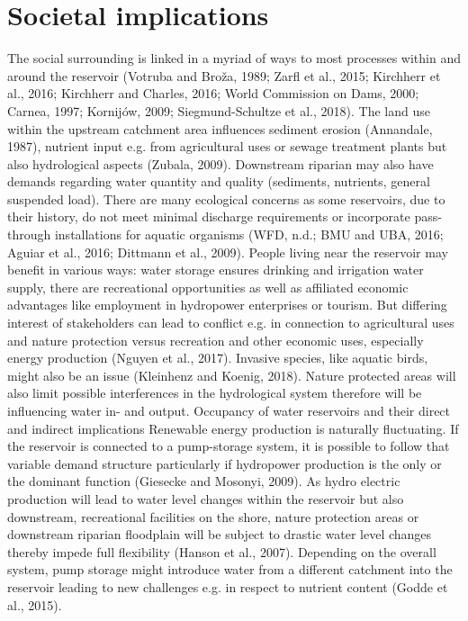 \section{Societal implications}
\label{sec:1}
The social surrounding is linked in a myriad of ways to most processes within and around the reservoir (Votruba and Broža, 1989; Zarfl et al., 2015; Kirchherr et al., 2016; Kirchherr and Charles, 2016; World Commission on Dams, 2000; Carnea, 1997; Kornijów, 2009; Siegmund-Schultze et al., 2018). The land use within the upstream catchment area influences sediment erosion (Annandale, 1987), nutrient input e.g. from agricultural uses or sewage treatment plants but also hydrological aspects (Zubala, 2009). Downstream riparian may also have demands regarding water quantity and quality (sediments, nutrients, general suspended load). There are many ecological concerns as some reservoirs, due to their history, do not meet minimal discharge requirements or incorporate pass-through installations for aquatic organisms (WFD, n.d.; BMU and UBA, 2016; Aguiar et al., 2016; Dittmann et al., 2009). People living near the reservoir may benefit in various ways: water storage ensures drinking and irrigation water supply, there are recreational opportunities as well as affiliated economic advantages like employment in hydropower enterprises or tourism. But differing interest of stakeholders can lead to conflict e.g. in connection to agricultural uses and nature protection versus recreation and other economic uses, especially energy production (Nguyen et al., 2017). Invasive species, like aquatic birds, might also be an issue (Kleinhenz and Koenig, 2018). Nature protected areas will also limit possible interferences in the hydrological system therefore will be influencing water in- and output.
Occupancy of water reservoirs and their direct and indirect implications
Renewable energy production is naturally fluctuating. If the reservoir is connected to a pump-storage system, it is possible to follow that variable demand structure particularly if hydropower production is the only or the dominant function (Giesecke and Mosonyi, 2009). As hydro electric production will lead to water level changes within the reservoir but also downstream, recreational facilities on the shore, nature protection areas or downstream riparian floodplain will be subject to drastic water level changes thereby impede full flexibility (Hanson et al., 2007). Depending on the overall system, pump storage might introduce water from a different catchment into the reservoir leading to new challenges e.g. in respect to nutrient content (Godde et al., 2015).
